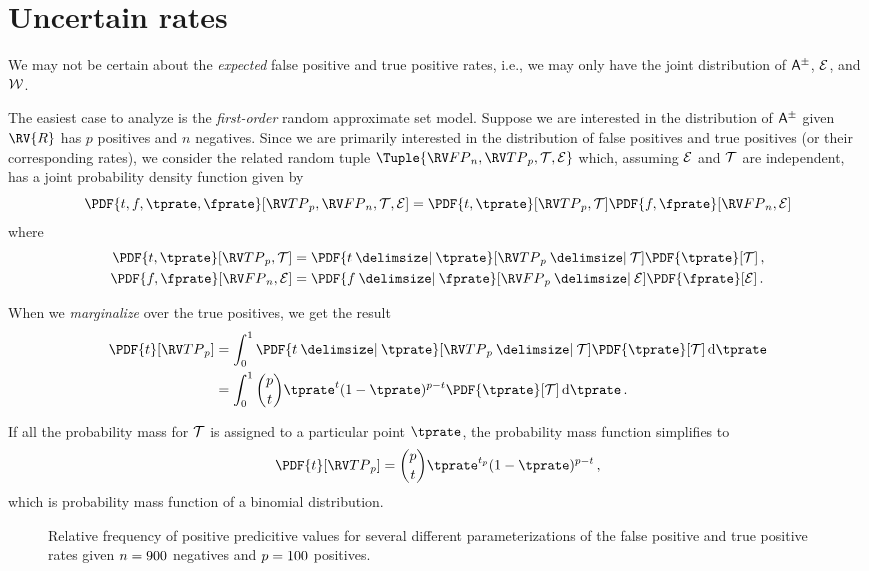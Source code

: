 \documentclass[ ../main.tex]{subfiles}
\begin{document}
\section{Uncertain rates}
\label{sec:intervals}
We may not be certain about the \emph{expected} false positive and true positive rates, i.e., we may only have the joint distribution of $\ASet{A}$, $\mathcal{E}$, and $\mathcal{W}$.

The easiest case to analyze is the \emph{first-order} random approximate set model.
Suppose we are interested in the distribution of $\ASet{A}$ given $\RV{R}$ has $p$ positives and $n$ negatives.
Since we are primarily interested in the distribution of false positives and true positives (or their corresponding rates), we consider the related random tuple $\Tuple{\FP_n, \TP_p, \TPR, \FPR}$ which, assuming $\mathcal{E}$ and $\mathcal{T}$ are independent, has a joint probability density function given by
\begin{equation}
	\PDF{t,f,\tprate,\fprate}[\TP_p, \FP_n,\TPR,\FPR] = \PDF{t, \tprate}[\TP_p,\TPR] \PDF{f,\fprate}[\FP_n,\FPR]
\end{equation}
where
\begin{align}
	\PDF{t,\tprate}[\TP_p,\TPR] &= \PDF{t \Given \tprate}[\TP_p \Given \TPR] \PDF{\tprate}[\TPR]\,,\\
	\PDF{f,\fprate}[\FP_n,\FPR] &= \PDF{f \Given \fprate}[\FP_p \Given \FPR] \PDF{\fprate}[\FPR]\,.
\end{align}

When we \emph{marginalize} over the true positives, we get the result
\begin{equation}
\begin{split}
	\PDF{t}[\TP_p] &= \int_{0}^{1} \PDF{t \Given \tprate}[\TP_p \Given \TPR] \PDF{\tprate}[\TPR] \dif \tprate\\
	                 &= \int_{0}^{1} \binom{p}{t} \tprate^{t}(1-\tprate)^{p-t} \PDF{\tprate}[\TPR] \dif \tprate\,.
\end{split}
\end{equation}

If all the probability mass for $\mathcal{T}$ is assigned to a particular point $\tprate$, the probability mass function simplifies to
\begin{equation}
\PDF{t}[\TP_p] = \binom{p}{t} \tprate^{t_p}(1-\tprate)^{p-t}\,,
\end{equation}
which is probability mass function of a binomial distribution.

\begin{figure}
	\def\svgwidth{\columnwidth}
	\centering
	\captionsetup{justification=centering}
	\caption
	{
		Relative frequency of positive predicitive values for several different parameterizations of the false positive and true positive rates given $n = 900$ negatives and $p=100$ positives.
	}    
	
	\label{fig:mixnorm}
\end{figure}
\end{document}
